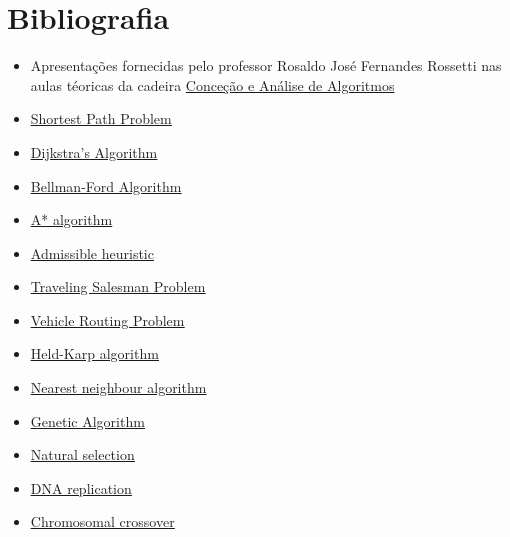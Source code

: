\documentclass[article, a4paper, 12pt, oneside]{memoir}
\begin{document}
\chapter{Bibliografia}
\begin{itemize}
	\item Apresentações fornecidas pelo professor Rosaldo José Fernandes Rossetti nas aulas téoricas da cadeira \href{https://sigarra.up.pt/feup/pt/ucurr_geral.ficha_uc_view?pv_ocorrencia_id=436441}{Conceção e Análise de Algoritmos}
	\item \color{blue} \underline{\href{https://en.wikipedia.org/wiki/Shortest_path_problem}{Shortest Path Problem}} \color{black}
	\item \color{blue} \underline{\href{https://en.wikipedia.org/wiki/Dijkstra\%27s_algorithm}{Dijkstra's Algorithm}} \color{black}
	\item \color{blue} \underline{\href{https://en.wikipedia.org/wiki/Bellman\%E2\%80\%93Ford_algorithm}{Bellman-Ford Algorithm}} \color{black}
	\item \color{blue} \underline{\href{https://en.wikipedia.org/wiki/A*_search_algorithm}{A* algorithm}} \color{black}
	\item \color{blue} \underline{\href{https://en.wikipedia.org/wiki/Admissible_heuristic}{Admissible heuristic}} \color{black}
	\item \color{blue} \underline{\href{https://en.wikipedia.org/wiki/Travelling_salesman_problem}{Traveling Salesman Problem}} \color{black}
	\item \color{blue} \underline{\href{https://en.wikipedia.org/wiki/Vehicle_routing_problem}{Vehicle Routing Problem}} \color{black}
	\item \color{blue} \underline{\href{https://en.wikipedia.org/wiki/Held\%E2\%80\%93Karp_algorithm}{Held-Karp algorithm}} \color{black}
	\item \color{blue} \underline{\href{https://en.wikipedia.org/wiki/Nearest_neighbour_algorithm}{Nearest neighbour algorithm}} \color{black}
	\item \color{blue} \underline{\href{https://en.wikipedia.org/wiki/Genetic_algorithm}{Genetic Algorithm}} \color{black}
	\item \color{blue} \underline{\href{https://en.wikipedia.org/wiki/Natural_selection}{Natural selection}} \color{black}
	\item \color{blue} \underline{\href{https://en.wikipedia.org/wiki/DNA_replication}{DNA replication}} \color{black}
	\item \color{blue} \underline{\href{https://en.wikipedia.org/wiki/Chromosomal_crossover}{Chromosomal crossover}} \color{black}

\end{itemize}
\end{document}
